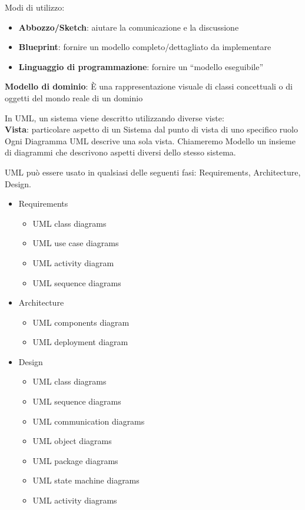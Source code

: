 Modi di utilizzo:
\begin{itemize}
    \item \textbf{Abbozzo/Sketch}: aiutare la comunicazione e la discussione
    \item \textbf{Blueprint}: fornire un modello completo/dettagliato da implementare
    \item \textbf{Linguaggio di programmazione}: fornire un “modello eseguibile”
\end{itemize}

\noindent \textbf{Modello di dominio}: \`E una rappresentazione visuale di classi concettuali o di oggetti del mondo reale di un dominio

\vspace{2mm}
\noindent In UML, un sistema viene descritto utilizzando diverse viste:\\
\textbf{Vista}: particolare aspetto di un Sistema dal punto di vista di uno specifico ruolo\\
Ogni Diagramma UML descrive una sola vista. Chiameremo Modello un insieme di diagrammi che descrivono aspetti diversi dello stesso sistema.

\vspace{2mm}
UML può essere usato in qualsiasi delle seguenti fasi: Requirements, Architecture, Design.
\begin{itemize}
    \item Requirements
    \begin{itemize}
        \item UML class diagrams
        \item UML use case diagrams
        \item UML activity diagram
        \item UML sequence diagrams
    \end{itemize}
    
    \item Architecture
    \begin{itemize}
        \item UML components diagram
        \item UML deployment diagram
    \end{itemize}
    
    \item Design
    \begin{itemize}
        \item UML class diagrams
        \item UML sequence diagrams
        \item UML communication diagrams
        \item UML object diagrams
        \item UML package diagrams
        \item UML state machine diagrams
        \item UML activity diagrams
    \end{itemize}
\end{itemize}

